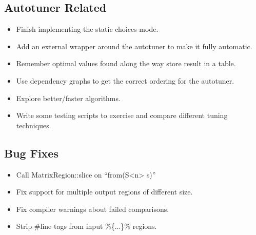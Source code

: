\documentclass[11pt]{article}
\begin{document}
\subsection{Autotuner Related}
\begin{itemize}

\item Finish implementing the static choices mode.

\item Add an external wrapper around the autotuner to make it fully automatic.

\item Remember optimal values found along the way store result in a table.

\item Use dependency graphs to get the correct ordering for the autotuner.

\item Explore better/faster algorithms.

\item Write some testing scripts to exercise and compare different tuning techniques.

\end{itemize}

\subsection{Bug Fixes}
\begin{itemize}

\item Call MatrixRegion::slice on ``from(S<n> s)''

\item Fix support for multiple output regions of different size.

\item Fix compiler warnings about failed comparisons.

\item Strip \#line tags from input \%\{...\}\% regions.

\end{itemize}
\end{document}
